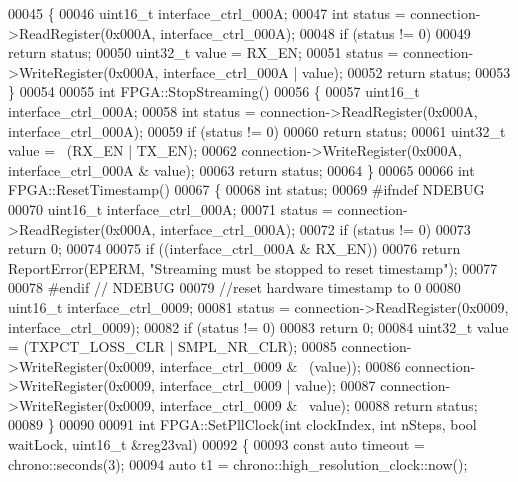 \begin{DoxyCode}
00045 \{
00046     uint16\_t interface\_ctrl\_000A;
00047     \textcolor{keywordtype}{int} status = connection->ReadRegister(0x000A, interface\_ctrl\_000A);
00048     \textcolor{keywordflow}{if} (status != 0)
00049         \textcolor{keywordflow}{return} status;
00050     uint32\_t value = RX_EN;
00051     status = connection->WriteRegister(0x000A, interface\_ctrl\_000A | value);
00052     \textcolor{keywordflow}{return} status;
00053 \}
00054 
00055 \textcolor{keywordtype}{int} FPGA::StopStreaming()
00056 \{
00057     uint16\_t interface\_ctrl\_000A;
00058     \textcolor{keywordtype}{int} status = connection->ReadRegister(0x000A, interface\_ctrl\_000A);
00059     \textcolor{keywordflow}{if} (status != 0)
00060         \textcolor{keywordflow}{return} status;
00061     uint32\_t value = ~(RX\_EN | TX_EN);
00062     connection->WriteRegister(0x000A, interface\_ctrl\_000A & value);
00063     \textcolor{keywordflow}{return} status;
00064 \}
00065 
00066 \textcolor{keywordtype}{int} FPGA::ResetTimestamp()
00067 \{
00068     \textcolor{keywordtype}{int} status;
00069 \textcolor{preprocessor}{#ifndef NDEBUG}
00070     uint16\_t interface\_ctrl\_000A;
00071     status = connection->ReadRegister(0x000A, interface\_ctrl\_000A);
00072     \textcolor{keywordflow}{if} (status != 0)
00073         \textcolor{keywordflow}{return} 0;
00074 
00075     \textcolor{keywordflow}{if} ((interface\_ctrl\_000A & RX\_EN))
00076         \textcolor{keywordflow}{return} ReportError(EPERM, \textcolor{stringliteral}{"Streaming must be stopped to reset timestamp"});
00077 
00078 \textcolor{preprocessor}{#endif // NDEBUG}
00079     \textcolor{comment}{//reset hardware timestamp to 0}
00080     uint16\_t interface\_ctrl\_0009;
00081     status = connection->ReadRegister(0x0009, interface\_ctrl\_0009);
00082     \textcolor{keywordflow}{if} (status != 0)
00083         \textcolor{keywordflow}{return} 0;
00084     uint32\_t value = (TXPCT\_LOSS\_CLR | SMPL_NR_CLR);
00085     connection->WriteRegister(0x0009, interface\_ctrl\_0009 & ~(value));
00086     connection->WriteRegister(0x0009, interface\_ctrl\_0009 | value);
00087     connection->WriteRegister(0x0009, interface\_ctrl\_0009 & ~value);
00088     \textcolor{keywordflow}{return} status;
00089 \}
00090 
00091 \textcolor{keywordtype}{int} FPGA::SetPllClock(\textcolor{keywordtype}{int} clockIndex, \textcolor{keywordtype}{int} nSteps, \textcolor{keywordtype}{bool} waitLock, uint16\_t &reg23val)
00092 \{
00093     \textcolor{keyword}{const} \textcolor{keyword}{auto} timeout = chrono::seconds(3);
00094     \textcolor{keyword}{auto} t1 = chrono::high\_resolution\_clock::now();

\end{DoxyCode}
